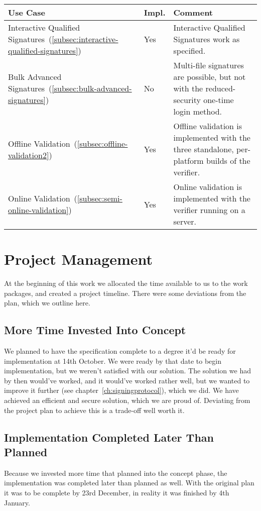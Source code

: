 \begin{center}
    \begin{longtable}{p{5.35cm}|p{0.7cm}|p{9.0cm}}
        \textbf{Use Case} & \textbf{Impl.} & \textbf{Comment}
        \\
        \hline
        Interactive Qualified Signatures~(\ref{subsec:interactive-qualified-signatures})
        & Yes
        & Interactive Qualified Signatures work as specified.
        \\
        \hline
        Bulk Advanced Signatures~(\ref{subsec:bulk-advanced-signatures})
        & No
        & Multi-file signatures are possible,
        but not with the reduced-security one-time login method.
        \\
        \hline
        Offline Validation~(\ref{subsec:offline-validation2})
        & Yes
        & Offline validation is implemented with the three standalone,
        per-platform builds of the verifier.
        \\
        \hline
        Online Validation~(\ref{subsec:semi-online-validation})
        & Yes
        & Online validation is implemented with the verifier running on a server.
        \\
        \hline
    \end{longtable}
\end{center}


\section{Project Management}\label{sec:project-management}
At the beginning of this work we allocated the time available to us
to the work packages, and created a project timeline.
There were some deviations from the plan,
which we outline here.

\subsection{More Time Invested Into Concept}\label{subsec:more-time-invested-into-concept}
We planned to have the specification complete to a degree it'd be ready for implementation at 14th October.
We were ready by that date to begin implementation,
but we weren't satisfied with our solution.
The solution we had by then would've worked, and it would've worked rather well,
but we wanted to improve it further (see chapter~\ref{ch:signingprotocol}), which we did.
We have achieved an efficient and secure solution, which we are proud of.
Deviating from the project plan to achieve this is a trade-off well worth it.

\subsection{Implementation Completed Later Than Planned}\label{subsec:implementation-completed-later-than-planned}
Because we invested more time that planned into the concept phase,
the implementation was completed later than planned as well.
With the original plan it was to be complete by 23rd December, in reality it was finished by 4th January.

